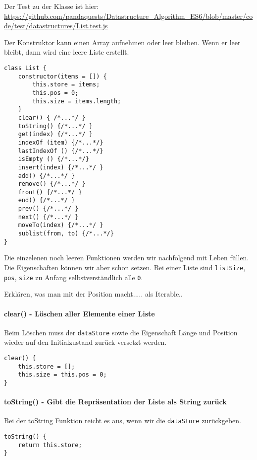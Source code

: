 \documentclass[babel]{book}
\begin{document}
Der Test zu der Klasse ist hier: \url{https://github.com/pandaquests/Datastructure_Algorithm_ES6/blob/master/code/test/datastructures/List.test.js}

Der Konstruktor kann einen Array aufnehmen oder leer bleiben. Wenn er leer bleibt, dann wird eine leere Liste erstellt.

\begin{lstlisting}[caption=Array Konstruktor]
class List {
	constructor(items = []) {
		this.store = items;
		this.pos = 0;
		this.size = items.length;
	}
	clear() { /*...*/ }
	toString() {/*...*/ }
	get(index) {/*...*/ }
	indexOf (item) {/*...*/}
	lastIndexOf () {/*...*/}
	isEmpty () {/*...*/}
	insert(index) {/*...*/ }
	add() {/*...*/ }
	remove() {/*...*/ }
	front() {/*...*/ }
	end() {/*...*/ }
	prev() {/*...*/ }
	next() {/*...*/ }
	moveTo(index) {/*...*/ }
	sublist(from, to) {/*...*/}
}
\end{lstlisting}

Die einzelenen noch leeren Funktionen werden wir nachfolgend mit Leben füllen. Die Eigenschaften können wir aber schon setzen. Bei einer Liste sind \lstinline|listSize|, \lstinline|pos|, \lstinline|size| zu Anfang selbstverständlich alle \lstinline|0|.

Erklären, was man mit der Position macht..... als Iterable..

\paragraph{clear() - Löschen aller Elemente einer Liste}
Beim Löschen muss der \lstinline|dataStore| sowie die Eigenschaft Länge und Position wieder auf den Initialzustand zurück versetzt werden.

\begin{lstlisting}[caption=Array Konstruktor]
clear() {
	this.store = [];
	this.size = this.pos = 0;	
}
\end{lstlisting}

\paragraph{toString() - Gibt die Repräsentation der Liste als String zurück} Bei der toString Funktion reicht es aus, wenn wir die \lstinline|dataStore| zurückgeben.

\begin{lstlisting}[caption=Array Konstruktor]
toString() {
	return this.store;
}
\end{lstlisting}
\end{document}
